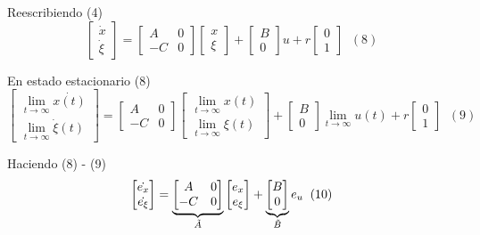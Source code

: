 Reescribiendo (4)
\[
    \begin{bmatrix}
        \dot{x} \\ \dot{\xi}
    \end{bmatrix} = 
    \begin{bmatrix}
        A & 0 \\
        -C & 0
    \end{bmatrix}
    \begin{bmatrix}
        x \\ \xi
    \end{bmatrix} +
    \begin{bmatrix}
        B \\ 0
    \end{bmatrix}u + r
    \begin{bmatrix}
        0 \\ 1
    \end{bmatrix} \;\; (8)  
\]

En estado estacionario (8)
\[
    \begin{bmatrix}
        \lim_{t \to \infty} \dot{x(t)} \\ 
        \lim_{t \to \infty} \dot{\xi} (t)
    \end{bmatrix} = 
    \begin{bmatrix}
        A & 0 \\
        -C & 0
    \end{bmatrix}
    \begin{bmatrix}
        \lim_{t \to \infty} x(t) \\
        \lim_{t \to \infty} \xi (t)
    \end{bmatrix} +
    \begin{bmatrix}
        B \\ 0
    \end{bmatrix} \lim_{t \to \infty} u(t) + r
    \begin{bmatrix}
        0 \\ 1
    \end{bmatrix} \;\; (9)
\]

Haciendo (8) - (9)
\[
    \begin{bmatrix}
        \dot{e_{x}} \\ 
        \dot{e_{\xi}}
    \end{bmatrix} = 
    \underbrace
    {
    \begin{bmatrix}
        A & 0 \\
        -C & 0
    \end{bmatrix}
    }_{\Tilde{A}}
    \begin{bmatrix}
        e_{x} \\
        e_{\xi}
    \end{bmatrix} +
    \underbrace{
        \begin{bmatrix}
            B \\ 0
        \end{bmatrix}
                }_{\tilde{B}}
    e_{u} \;\; (10)
\]

